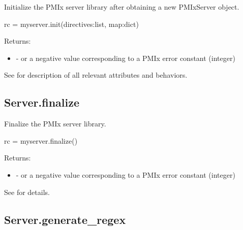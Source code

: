 \summary Initialize the \ac{PMIx} server library after obtaining a new PMIxServer object.

\format

\pyspecificstart
\begin{codepar}
rc = myserver.init(directives:list, map:dict)
\end{codepar}
\pyspecificend


\begin{arglist}
\end{arglist}

Returns:

\begin{itemize}
    \item {} -  or a negative value corresponding to a PMIx error constant (integer)
\end{itemize}

See  for description of all relevant attributes and behaviors.


\subsection{Server.finalize}

\summary Finalize the \ac{PMIx} server library.

\format

\pyspecificstart
\begin{codepar}
rc = myserver.finalize()
\end{codepar}
\pyspecificend


Returns:

\begin{itemize}
    \item {} -  or a negative value corresponding to a PMIx error constant (integer)
\end{itemize}

See  for details.


\subsection{Server.generate_regex}

